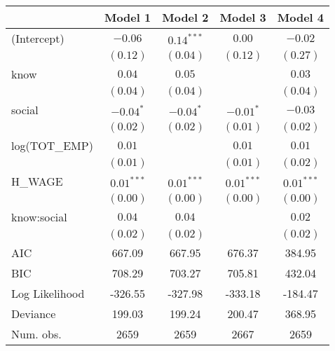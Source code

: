 

\usepackage{booktabs}
\begin{table}
\begin{center}
\begin{tabular}{l c c c c }
\toprule
                                  & Model 1 & Model 2 & Model 3 & Model 4 \\
\midrule
(Intercept)                       & $-0.06$      & $0.14^{***}$ & $0.00$       & $-0.02$      \\
                                  & $(0.12)$     & $(0.04)$     & $(0.12)$     & $(0.27)$     \\
know                              & $0.04$       & $0.05$       &              & $0.03$       \\
                                  & $(0.04)$     & $(0.04)$     &              & $(0.04)$     \\
social                            & $-0.04^{*}$  & $-0.04^{*}$  & $-0.01^{*}$  & $-0.03$      \\
                                  & $(0.02)$     & $(0.02)$     & $(0.01)$     & $(0.02)$     \\
log(TOT_EMP)                      & $0.01$       &              & $0.01$       & $0.01$       \\
                                  & $(0.01)$     &              & $(0.01)$     & $(0.02)$     \\
H_WAGE                            & $0.01^{***}$ & $0.01^{***}$ & $0.01^{***}$ & $0.01^{***}$ \\
                                  & $(0.00)$     & $(0.00)$     & $(0.00)$     & $(0.00)$     \\
know:social                       & $0.04$       & $0.04$       &              & $0.02$       \\
                                  & $(0.02)$     & $(0.02)$     &              & $(0.02)$     \\
\midrule
AIC                               & 667.09       & 667.95       & 676.37       & 384.95       \\
BIC                               & 708.29       & 703.27       & 705.81       & 432.04       \\
Log Likelihood                    & -326.55      & -327.98      & -333.18      & -184.47      \\
Deviance                          & 199.03       & 199.24       & 200.47       & 368.95       \\
Num. obs.                         & 2659         & 2659         & 2667         & 2659         \\

\end{tabular}
\end{center}
\end{table}
